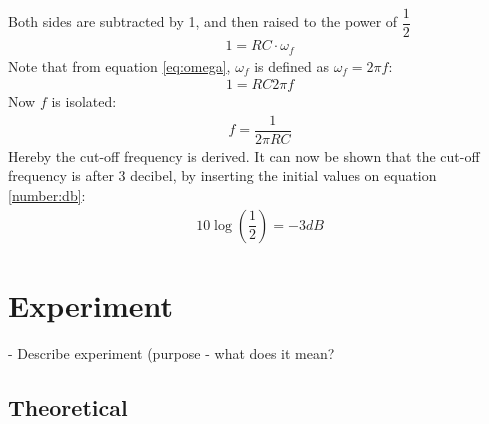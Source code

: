 Both sides are subtracted by 1, and then raised to the power of $\dfrac{1}{2}$
\begin{align*}
1 = RC \cdot \omega_f 
\end{align*}
Note that from equation \eqref{eq:omega}, $\omega_f$ is defined as $\omega_f=2 \pi f$:
\begin{align*}
1 = RC 2\pi f 
\end{align*}
Now $f$ is isolated:
\begin{align*}
f=\dfrac{1}{2\pi RC}
\end{align*}
Hereby the cut-off frequency is derived. It can now be shown that the cut-off frequency is after 3 decibel, by inserting the initial values on equation \eqref{number:db}:
\begin{align*}
10 \log \left(\dfrac{1}{2} \right) = -3 dB
\end{align*}
\section{Experiment} \label{experiment}
- Describe experiment (purpose - what does it mean?
\subsection{Theoretical}

